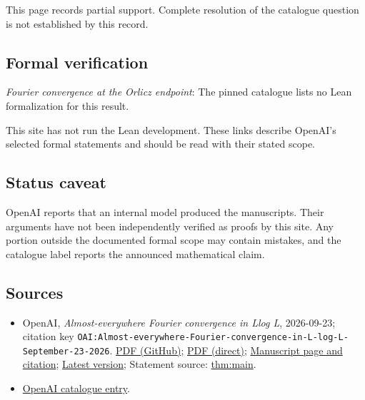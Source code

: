\documentclass[11pt]{article}
\begin{document}
This page records partial support. Complete resolution of the catalogue question is not established by this record.

\subsection{Formal verification}
\textit{Fourier convergence at the Orlicz endpoint}: The pinned catalogue lists no Lean formalization for this result.

This site has not run the Lean development. These links describe OpenAI’s selected formal statements and should be read with their stated scope.

\subsection{Status caveat}
OpenAI reports that an internal model produced the manuscripts. Their arguments have not been independently verified as proofs by this site. Any portion outside the documented formal scope may contain mistakes, and the catalogue label reports the announced mathematical claim.

\subsection{Sources}
\begin{itemize}
\item OpenAI, \emph{Almost-everywhere Fourier convergence in Llog L}, 2026-09-23; citation key \texttt{OAI:Almost-everywhere-Fourier-convergence-in-L-log-L-September-23-2026}. \href{https://github.com/openai/math/blob/adc7f1241b42e322a6451854ab7e4b4c146bf78a/preprints/Almost-everywhere-Fourier-convergence-in-L-log-L-September-23-2026/paper.pdf}{PDF (GitHub)}; \href{https://github.com/openai/math/raw/adc7f1241b42e322a6451854ab7e4b4c146bf78a/preprints/Almost-everywhere-Fourier-convergence-in-L-log-L-September-23-2026/paper.pdf}{PDF (direct)}; \href{https://github.com/openai/math/blob/adc7f1241b42e322a6451854ab7e4b4c146bf78a/preprints/Almost-everywhere-Fourier-convergence-in-L-log-L-September-23-2026/README.md}{Manuscript page and citation}; \href{https://github.com/openai/math/blob/main/preprints/Almost-everywhere-Fourier-convergence-in-L-log-L-September-23-2026/paper.pdf}{Latest version}; Statement source: \href{https://github.com/openai/math/blob/adc7f1241b42e322a6451854ab7e4b4c146bf78a/preprints/Almost-everywhere-Fourier-convergence-in-L-log-L-September-23-2026/build/sections/01-introduction.tex\#L17}{thm:main}.
\item \href{https://github.com/openai/math/blob/adc7f1241b42e322a6451854ab7e4b4c146bf78a/CONTENTS.md}{OpenAI catalogue entry}.
\end{itemize}
\end{document}
